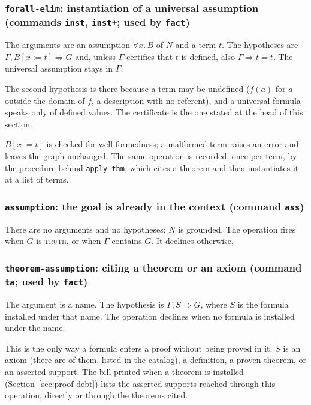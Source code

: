 \subsubsection*{\texttt{forall-elim}: instantiation of a universal assumption
  (commands \texttt{inst}, \texttt{inst+}; used by \texttt{fact})}

The arguments are an assumption $\forall x.\, B$ of $N$ and a term $t$.
The hypotheses are $\Gamma, B[x{:=}t] \Longrightarrow G$ and, unless
$\Gamma$ certifies that $t$ is defined, also $\Gamma \Longrightarrow t = t$.
The universal assumption stays in $\Gamma$.

The second hypothesis is there because a term may be undefined ($f(a)$
for $a$ outside the domain of $f$, a description with no referent), and a
universal formula speaks only of defined values.  The certificate is the
one stated at the head of this section.

$B[x{:=}t]$ is checked for well-formedness; a malformed term raises an
error and leaves the graph unchanged.  The same operation is recorded,
once per term, by the procedure behind \texttt{apply-thm}, which cites a
theorem and then instantiates it at a list of terms.

\subsubsection*{\texttt{assumption}: the goal is already in the context
  (command \texttt{ass})}

There are no arguments and no hypotheses; $N$ is grounded.  The operation
fires when $G$ is \textsc{truth}, or when $\Gamma$ contains $G$.  It
declines otherwise.

\subsubsection*{\texttt{theorem-assumption}: citing a theorem or an axiom
  (command \texttt{ta}; used by \texttt{fact})}

The argument is a name.  The hypothesis is $\Gamma, S \Longrightarrow G$,
where $S$ is the formula installed under that name.  The operation
declines when no formula is installed under the name.

This is the only way a formula enters a proof without being proved in
it.  $S$ is an axiom (there are \VNBaxiomcount{} of them, listed in the
catalog), a definition, a proven theorem, or an asserted support.  The
bill printed when a theorem is installed
(Section~\ref{sec:proof-debt}) lists the asserted supports reached
through this operation, directly or through the theorems cited.

